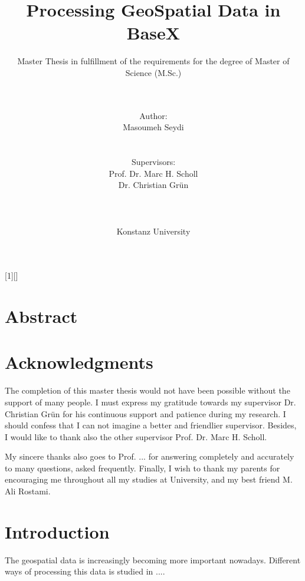 \documentclass[a4paper,12pt]{article}
\title{Processing GeoSpatial Data in BaseX}
\subtitle{Master Thesis in fulfillment of the requirements for the degree of
Master of Science (M.Sc.)}
\author{\\\\Author: \\
	Masoumeh Seydi
	\\\\\\Supervisors: \\
	Prof. Dr. Marc H. Scholl \\ 
	Dr. Christian Gr{\"u}n \\
	\\\\\\
	Konstanz University}
\begin{document}
[1][]{
\lstset{#1}}{}

\renewcommand{\lstlistingname}{Code}


\maketitle
\thispagestyle{empty}

\newpage
\section*{Abstract}

\thispagestyle{empty}

\newpage
\section*{Acknowledgments}
\thispagestyle{empty}

The completion of this master thesis would not have been possible 
without the support of many people. 
I must express my gratitude towards my supervisor 
Dr. Christian Gr{\"u}n for his continuous support and patience during my research.
I should confess that I can not imagine a better and friendlier
supervisor. Besides, I would like to thank also the other supervisor
Prof. Dr. Marc H. Scholl.

My sincere thanks also goes to Prof. ...  for
answering completely and accurately to many questions, asked
frequently. Finally, I wish to thank my parents for encouraging me 
throughout all my studies at University, and my best friend M. Ali Rostami.


\newpage
\tableofcontents

\thispagestyle{empty}
\newpage
\section{Introduction}
\setcounter{page}{1}
The geospatial data is increasingly becoming more important nowadays.
Different ways of processing this data is studied in ....
\end{document}
